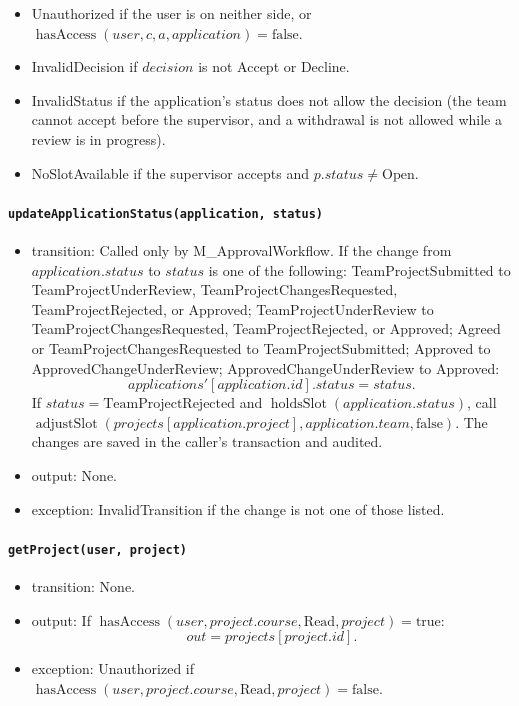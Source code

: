 \documentclass[12pt, titlepage]{article}
\begin{document}
\begin{itemize}
\begin{itemize}
        \item Unauthorized if the user is on neither side, or $\operatorname{hasAccess}(user,c,a,application)=\text{false}$.
        \item InvalidDecision if $decision$ is not Accept or Decline.
        \item InvalidStatus if the application's status does not allow the decision (the team cannot accept before the supervisor, and a withdrawal is not allowed while a review is in progress).
        \item NoSlotAvailable if the supervisor accepts and $p.status\ne\text{Open}$.
    \end{itemize}
\end{itemize}

\paragraph{\texttt{updateApplicationStatus(application, status)}}
\begin{itemize}
    \item transition: Called only by M\_ApprovalWorkflow. If the change from $application.status$ to $status$ is one of the following: TeamProjectSubmitted to TeamProjectUnderReview, TeamProjectChangesRequested, TeamProjectRejected, or Approved; TeamProjectUnderReview to TeamProjectChangesRequested, TeamProjectRejected, or Approved; Agreed or TeamProjectChangesRequested to TeamProjectSubmitted; Approved to ApprovedChangeUnderReview; ApprovedChangeUnderReview to Approved:
    \[
    \mathit{applications}'[application.id].status=status.
    \]
    If $status=\text{TeamProjectRejected}$ and $\operatorname{holdsSlot}(application.status)$, call $\operatorname{adjustSlot}(\mathit{projects}[application.project],application.team,\text{false})$. The changes are saved in the caller's transaction and audited.
    \item output: None.
    \item exception: InvalidTransition if the change is not one of those listed.
\end{itemize}

\paragraph{\texttt{getProject(user, project)}}
\begin{itemize}
    \item transition: None.
    \item output: If $\operatorname{hasAccess}(user,project.course,\text{Read},project)=\text{true}$:
    \[
    out=\mathit{projects}[project.id].
    \]
    \item exception: Unauthorized if $\operatorname{hasAccess}(user,project.course,\text{Read},project)=\text{false}$.
\end{itemize}
\end{document}
